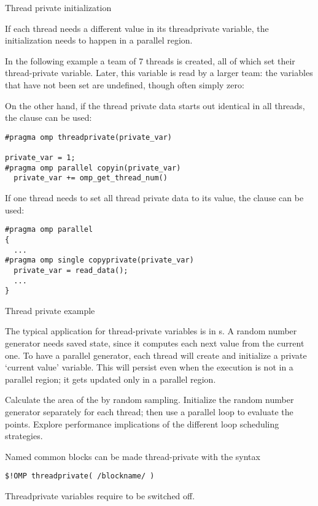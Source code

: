  {Thread private initialization}

If each thread needs a different value in its threadprivate variable,
the initialization needs to happen in a parallel region.

In the following example a team of 7 threads is created, all of which
set their thread-private variable. Later, this variable is read by a
larger team: the variables that have not been set are undefined,
though often simply zero:
%

On the other hand, if the thread private data starts out identical in
all threads, the  clause can be used:
\begin{lstlisting}
#pragma omp threadprivate(private_var)

private_var = 1;
#pragma omp parallel copyin(private_var)
  private_var += omp_get_thread_num()
\end{lstlisting}

If one thread needs to set all thread private data to its value, the
 clause can be used:
\begin{lstlisting}
#pragma omp parallel
{
  ...
#pragma omp single copyprivate(private_var)
  private_var = read_data();
  ...
}
\end{lstlisting}

 {Thread private example}

The typical application for thread-private variables is in
s.
A random number generator needs saved state, since it computes each next value
from the current one. To have a parallel generator, each thread will create
and initialize a private `current value' variable. This will persist
even when the execution is not in a parallel region; it gets updated only
in a parallel region.

\begin{exercise}
  \label{ex:random-mandel}
  Calculate the area of the  by random
  sampling. Initialize the random number generator separately for each
  thread; then use a parallel loop to evaluate the points.
  Explore performance implications of the different loop scheduling strategies.
\end{exercise}

\begin{fortrannote}
  Named common blocks can be made thread-private with the syntax
\begin{lstlisting}
$!OMP threadprivate( /blockname/ )
\end{lstlisting}
\end{fortrannote}

Threadprivate variables require  to be
switched off.

